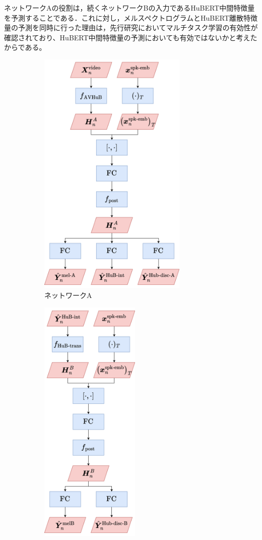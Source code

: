 ネットワークAの役割は，続くネットワークBの入力であるHuBERT中間特徴量を予測することである．これに対し，メルスペクトログラムとHuBERT離散特徴量の予測を同時に行った理由は，先行研究\cite{kim2023lip_multitask,choi2023intelligible}においてマルチタスク学習の有効性が確認されており、HuBERT中間特徴量の予測においても有効ではないかと考えたからである。

\begin{figure}[tb]
    \centering
    \begin{subfigure}[b]{0.48\textwidth}
        \centering
        \includegraphics[height=120mm]{./figure/sec4/model_2/networkA.drawio.png}
        \caption{ネットワークA}
        \label{sec4:fig:networkA}
    \end{subfigure}
    \hfill
    \begin{subfigure}[b]{0.48\textwidth}
        \centering
        \includegraphics[height=120mm]{./figure/sec4/model_2/networkB.drawio.png}

\end{subfigure}
\end{figure}
